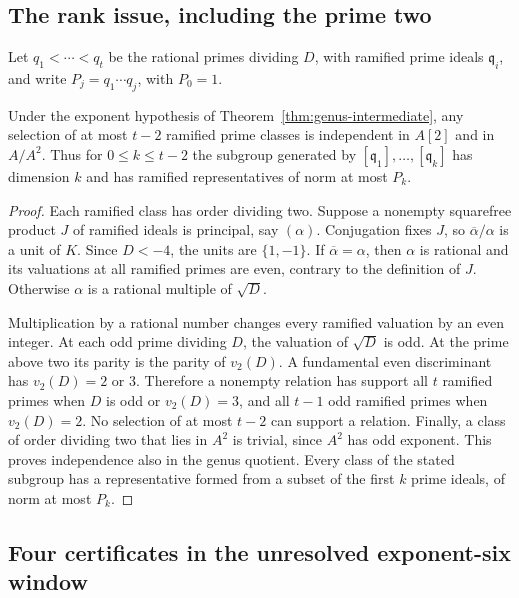 \subsection{The rank issue, including the prime two}

Let $q_1<\cdots<q_t$ be the rational primes dividing $D$, with
ramified prime ideals $\mathfrak q_i$, and write
$P_j=q_1\cdots q_j$, with $P_0=1$.

\begin{lemma}\label{lem:ramified-independent}
Under the exponent hypothesis of Theorem~\ref{thm:genus-intermediate},
any selection of at most $t-2$ ramified prime classes is independent in
$A[2]$ and in $A/A^2$. Thus for $0\le k\le t-2$ the subgroup generated
by $[\mathfrak q_1],\ldots,[\mathfrak q_k]$ has dimension $k$ and has
ramified representatives of norm at most $P_k$.
\end{lemma}

\begin{proof}
Each ramified class has order dividing two. Suppose a nonempty
squarefree product $J$ of ramified ideals is principal, say $(\alpha)$.
Conjugation fixes $J$, so $\overline\alpha/\alpha$ is a unit of $K$.
Since $D<-4$, the units are $\{1,-1\}$. If
$\overline\alpha=\alpha$, then $\alpha$ is rational and its valuations
at all ramified primes are even, contrary to the definition of $J$.
Otherwise $\alpha$ is a rational multiple of $\sqrt D$.

Multiplication by a rational number changes every ramified valuation by
an even integer. At each odd prime dividing $D$, the valuation of
$\sqrt D$ is odd. At the prime above two its parity is the parity of
$v_2(D)$. A fundamental even discriminant has $v_2(D)=2$ or $3$.
Therefore a nonempty relation has support all $t$ ramified primes when
$D$ is odd or $v_2(D)=3$, and all $t-1$ odd ramified primes when
$v_2(D)=2$. No selection of at most $t-2$ can support a relation.
Finally, a class of order dividing two that lies in $A^2$ is trivial,
since $A^2$ has odd exponent. This proves independence also in the genus
quotient. Every class of the stated subgroup has a representative formed
from a subset of the first $k$ prime ideals, of norm at most $P_k$.
\end{proof}

\subsection{Four certificates in the unresolved exponent-six window}


